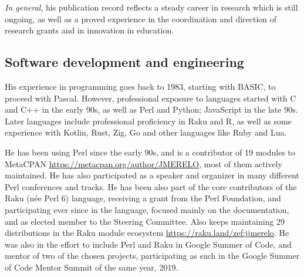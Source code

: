 \documentclass[a4paper,12pt]{article}
\begin{document}
{\em In general}, his publication record reflects a steady career in research
which is still ongoing, as well as a proved experience in the coordination and
direction of research grants and in innovation in education.

\subsection{Software development and engineering}

His experience in programming goes back to 1983, starting with BASIC, to proceed
with Pascal. However, professional exposure to languages started with C and C++
in the early 90s, as well as Perl and Python; JavaScript in the late 90s. Later
languages include professional proficiency in Raku and R, as well as some
experience with Kotlin, Rust, Zig, Go and other languages like Ruby and Lua.

He has been using Perl since the early 90s, and is a contributor of 19 modules
to MetaCPAN \url{https://metacpan.org/author/JMERELO}, most of them actively
maintained. He has also participated as a speaker and organizer in many different
Perl conferences and tracks. He has been also part of the core contributors of
the Raku (née Perl 6) language, receiving a grant from the Perl Foundation, and
participating ever since in the language, focused mainly on the documentation,
and as elected member to the Steering Committee. Also keeps maintaining 29
distributions in the Raku module ecosystem
\url{https://raku.land/zef:jjmerelo}. He was also in the effort to include Perl
and Raku in Google Summer of Code, and mentor of two of the chosen projects,
participating as such in the Google Summer of Code Mentor Summit of the same
year, 2019.


\end{document}
